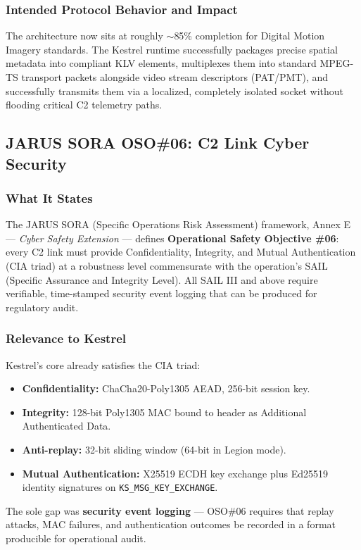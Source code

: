 \documentclass[11pt,a4paper]{article}
\begin{document}
\subsubsection{Intended Protocol Behavior and Impact}
The architecture now sits at roughly $\sim$85\% completion for Digital Motion Imagery standards. The Kestrel runtime successfully packages precise spatial metadata into compliant KLV elements, multiplexes them into standard MPEG-TS transport packets alongside video stream descriptors (PAT/PMT), and successfully transmits them via a localized, completely isolated socket without flooding critical C2 telemetry paths.


\subsection{JARUS SORA OSO\#06: C2 Link Cyber Security}

\subsubsection{What It States}
The JARUS SORA (Specific Operations Risk Assessment) framework, Annex E --- \emph{Cyber Safety Extension} --- defines \textbf{Operational Safety Objective \#06}: every C2 link must provide Confidentiality, Integrity, and Mutual Authentication (CIA triad) at a robustness level commensurate with the operation's SAIL (Specific Assurance and Integrity Level). All SAIL III and above require verifiable, time-stamped security event logging that can be produced for regulatory audit.

\subsubsection{Relevance to Kestrel}
Kestrel's core already satisfies the CIA triad:
\begin{itemize}
    \item \textbf{Confidentiality:} ChaCha20-Poly1305 AEAD, 256-bit session key.
    \item \textbf{Integrity:} 128-bit Poly1305 MAC bound to header as Additional Authenticated Data.
    \item \textbf{Anti-replay:} 32-bit sliding window (64-bit in Legion mode).
    \item \textbf{Mutual Authentication:} X25519 ECDH key exchange plus Ed25519 identity signatures on \texttt{KS\_MSG\_KEY\_EXCHANGE}.
\end{itemize}
The sole gap was \textbf{security event logging} --- OSO\#06 requires that replay attacks, MAC failures, and authentication outcomes be recorded in a format producible for operational audit.
\end{document}
